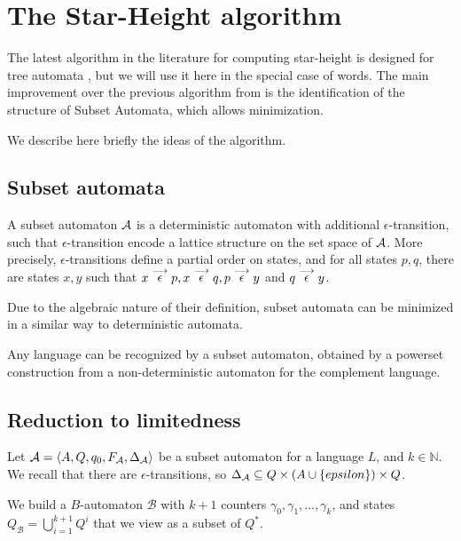 \newcommand{\cB}{\mathcal B}

\section{The Star-Height algorithm}

The latest algorithm in the literature for computing star-height is designed for tree automata \cite{CL08sh}, but we will use it here in the special case of words. The main improvement over the previous algorithm from \cite{Kirsten05} is the identification of the structure of Subset Automata, which allows minimization.

We describe here briefly the ideas of the algorithm.

\subsection{Subset automata}

\begin{definition}\cite{CL08sh}
A subset automaton $\mathcal{A}$ is a deterministic automaton with additional $\epsilon$-transition, such that $\epsilon$-transition encode a lattice structure on the set space of $\mathcal{A}$. More precisely, $\epsilon$-transitions define a partial order on states, and for all states $p,q$, there are states $x,y$ such that $x\stackrel{\longrightarrow}{\epsilon}p, x\stackrel{\longrightarrow}{\epsilon}q, p\stackrel{\longrightarrow}{\epsilon}y$ and $q\stackrel{\longrightarrow}{\epsilon}y$.
\end{definition}

Due to the algebraic nature of their definition, subset automata can be minimized in a similar way to deterministic automata.

\begin{theorem}\cite{CL08sh}
Any language can be recognized by a subset automaton, obtained by a powerset construction from a non-deterministic automaton for the complement language.
\end{theorem}

\subsection{Reduction to limitedness}

Let $\mathcal{A}=\langle A,Q,q_0,F_{\mathcal{A}},\Delta_{\mathcal{A}} \rangle$ be a subset automaton for a language $L$, and $k\in \mathbb N$. We recall that there are $\epsilon$-transitions, so $\Delta_{\mathcal{A}}\subseteq Q\times (A\cup\{epsilon\})\times Q$.

We build a $B$-automaton $\cB$ with $k+1$ counters $\gamma_0,\gamma_1,\dots,\gamma_k$, and states $Q_\cB=\bigcup_{i=1}^{k+1} Q^i$ that we view as a subset of $Q^*$.

